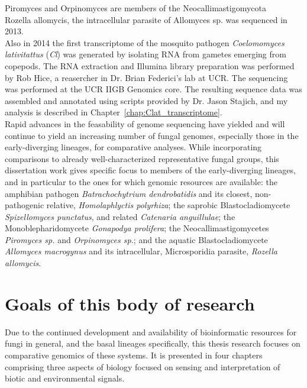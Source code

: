 \indent Piromyces and Orpinomyces are members of the Neocallimastigomycota \\
\indent Rozella allomycis, the intracellular parasite of Allomyces sp. was sequenced in 2013.\\
\indent Also in 2014 the first transcriptome of the mosquito pathogen \textit{Coelomomyces lativitattus} (\textit{Cl}) was generated by isolating RNA from gametes emerging from copepods. The RNA extraction and Illumina library preparation was performed by Rob Hice, a reasercher in Dr. Brian Federici's lab at UCR. The sequencing was performed at the UCR IIGB Genomics core. The resulting sequence data was assembled and annotated using scripts provided by Dr. Jason Stajich, and my analysis is described in Chapter~\ref{chap:Clat_transcriptome}.\\
\indent Rapid advances in the feasability of genome sequencing have yielded and will continue to yield an increasing number of fungal genomes, especially those in the early-diverging lineages, for comparative analyses. While incorporating comparisons to already well-characterized representative fungal groups, this dissertation work gives specific focus to members of the early-diverging lineages, and in particular to the ones for which genomic resources are available: the amphibian pathogen \textit{Batrachochytrium dendrobatidis} and its closest, non-pathogenic relative, \textit{Homolaphlyctis polyrhiza}; the saprobic Blastocladiomycete \textit{Spizellomyces punctatus}, and related \textit{Catenaria anguillulae}; the Monoblepharidomycete \textit{Gonapodya prolifera}; the Neocallimastigomycetes \textit{Piromyces sp.} and \textit{Orpinomyces sp.}; and the aquatic Blastocladiomycete \textit{Allomyces macrogynus} and its intracellular, Microsporidia parasite, \textit{Rozella allomycis}.
\section{Goals of this body of research}
Due to the continued development and availability of bioinformatic resources for fungi in general, and the basal lineages specifically, this thesis research focuses on comparative genomics of these systems. It is presented in four chapters comprising three aspects of biology focused on sensing and interpretation of biotic and environmental signals.\\
